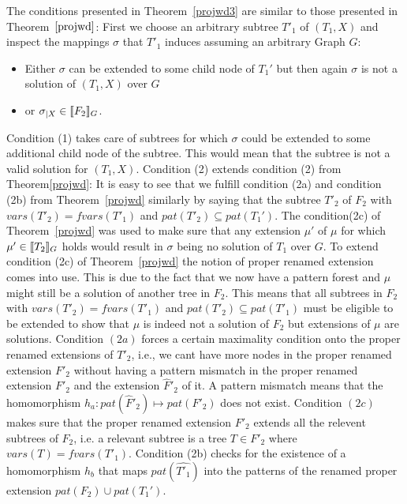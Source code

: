 \begin{proofidea}
 The conditions presented in Theorem~\ref{projwd3} are similar to those presented in
 Theorem~$\ref{projwd}$: First we choose an arbitrary subtree $T'_1$ of $(T_1,X)$ and
 inspect the mappings $\sigma$ that $T'_1$ induces assuming an arbitrary Graph
 $G$: 
 \begin{itemize}
	 \item Either $\sigma$ can be extended to some child node of $T_1'$ but then
 again $\sigma$ is not a solution of $(T_1,X)$ over $G$
	 \item  or $\sigma_{|X} \in \llbracket F_2\rrbracket_G$.
\end{itemize}
Condition (1) takes care of subtrees for which $\sigma$ could be extended
to some additional child node of the subtree. This would mean that the subtree
is not a valid solution for $(T_1,X)$.
Condition (2) extends condition (2) from Theorem\ref{projwd}:
It is easy to see that we fulfill condition (2a) and condition (2b)
from Theorem~\ref{projwd} similarly by saying that the subtree $T'_2$ of $F_2$
with $vars(T'_2) = fvars(T'_1)$ and $pat(T'_2) \subseteq pat(T_1')$.  
The condition(2c) of Theorem~\ref{projwd} was used to make sure
that any extension $\mu'$ of $\mu$ for which $\mu' \in \llbracket T_2\rrbracket_G$ holds would
result in $\sigma$ being no solution of $T_1$ over $G$. To extend
condition (2c) of Theorem~\ref{projwd} the notion of proper renamed extension
comes into use. This is due to the fact that we now have a pattern forest and
$\mu$ might still be a solution of another tree in $F_2$. This means that all
subtrees in $F_2$ with $vars(T'_2) = fvars(T'_1)$ and $pat(T'_2) \subseteq
pat(T'_1)$ must be eligible to be extended to show that $\mu$ is indeed not a
solution of $F_2$ but extensions of $\mu$ are solutions.
Condition $(2a)$ forces a certain maximality condition onto the proper renamed
extensions of $T'_2$, i.e., we cant have more nodes in the proper renamed
extension $F'_2$ without having a pattern mismatch in the proper renamed
extension $F'_2$ and
the extension $\hat{F}'_2$ of it. A pattern mismatch means that the homomorphism $h_a:
pat(\hat{F}'_2) \mapsto pat(F'_2)$ does not exist.
Condition $(2c)$ makes sure that the proper renamed extension $F'_2$
extends all the relevent subtrees of $F_2$, i.e. a relevant subtree is a tree $T
\in F'_2$ where $vars(T)  =fvars(T'_1)$.
Condition (2b) checks for the existence of a homomorphism $h_b$ that maps
$pat(\hat{T'_1})$ into the patterns of the renamed proper extension $pat(F_2)
\cup pat(T_1')$.
\end{proofidea}

